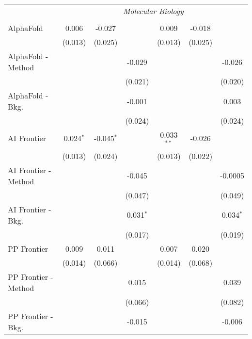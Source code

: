 \begin{tabular}{lcccccc}
 & \multicolumn{6}{c}{\textit{Molecular Biology}} \\ \\
   AlphaFold            & 0.006       & -0.027       &                & 0.009        & -0.018  &   \\   
                        & (0.013)     & (0.025)      &                & (0.013)      & (0.025) &   \\   
   AlphaFold - Method   &             &              & -0.029         &              &         & -0.026\\   
                        &             &              & (0.021)        &              &         & (0.020)\\   
   AlphaFold - Bkg.     &             &              & -0.001         &              &         & 0.003\\   
                        &             &              & (0.024)        &              &         & (0.024)\\   
   AI Frontier          & 0.024$^{*}$ & -0.045$^{*}$ &                & 0.033$^{**}$ & -0.026  &   \\   
                        & (0.013)     & (0.024)      &                & (0.013)      & (0.022) &   \\   
   AI Frontier - Method &             &              & -0.045         &              &         & -0.0005\\   
                        &             &              & (0.047)        &              &         & (0.049)\\   
   AI Frontier - Bkg.   &             &              & 0.031$^{*}$    &              &         & 0.034$^{*}$\\   
                        &             &              & (0.017)        &              &         & (0.019)\\   
   PP Frontier          & 0.009       & 0.011        &                & 0.007        & 0.020   &   \\   
                        & (0.014)     & (0.066)      &                & (0.014)      & (0.068) &   \\   
   PP Frontier - Method &             &              & 0.015          &              &         & 0.039\\   
                        &             &              & (0.066)        &              &         & (0.082)\\   
   PP Frontier - Bkg.   &             &              & -0.015         &              &         & -0.006\\   

\end{tabular}
